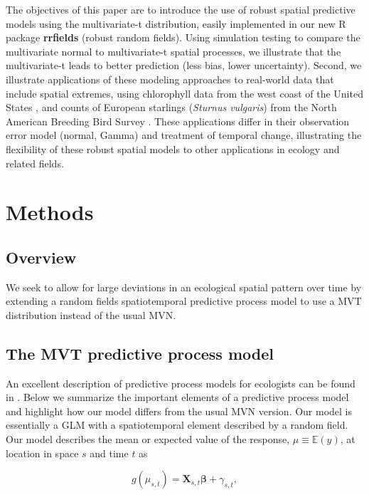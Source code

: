 \documentclass[12pt,english]{article}
\begin{document}
\begin{spacing}{1.05}
The objectives of this paper are to introduce the use of robust spatial
predictive models using the multivariate-t distribution, easily implemented in
our new R package \textbf{rrfields} (robust random fields). Using simulation
testing to compare the multivariate normal to multivariate-t spatial processes,
we illustrate that the multivariate-t leads to better prediction (less bias,
lower uncertainty). Second, we illustrate applications of these modeling
approaches to real-world data that include spatial extremes, using chlorophyll
data from the west coast of the United States \citep{mckibben2012}, and counts
of European starlings (\emph{Sturnus vulgaris}) from the North American
Breeding Bird Survey \citep{pardieck2016}. These applications differ in their
observation error model (normal, Gamma) and treatment of temporal change,
illustrating the flexibility of these robust spatial models to other
applications in ecology and related fields.

\section{Methods}

\subsection{Overview}

We seek to allow for large deviations in an ecological spatial pattern over
time by extending a random fields spatiotemporal predictive process model to
use a MVT distribution instead of the usual MVN.



\subsection{The MVT predictive process model}

An excellent description of predictive process models for ecologists can be
found in \citet{latimer2009}. Below we summarize the important elements of a
predictive process model and highlight how our model differs from the usual MVN
version. Our model is essentially a GLM with a spatiotemporal element described
by a random field. Our model describes the mean or expected value of the
response, $\mu \equiv \mathbb{E}(y)$, at location in space $s$ and time $t$ as

\begin{equation}
  g(\mu_{s,t}) = \bm{X}_{s,t} \bm{\beta} + \gamma_{s,t},
\end{equation}


\end{spacing}
\end{document}
